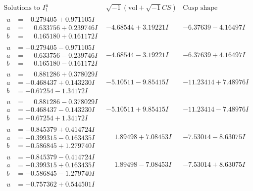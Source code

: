\documentclass[1p]{elsarticle_modified}
\theoremstyle{definition}
\newcommand{\I}{\sqrt{-1}}
\begin{document}
$$\begin{array}{c|c|c}  
\text{Solutions to }I^u_{1}& \I (\text{vol} + \sqrt{-1}CS) & \text{Cusp shape}\\
 \hline 
\begin{aligned}
u &= -0.279405 + 0.971105 I \\
a &= \phantom{-}0.633756 + 0.239746 I \\
b &= \phantom{-}0.165180 + 0.161172 I\end{aligned}
 & -4.68544 + 3.19221 I & -6.37639 - 4.16497 I \\ \hline\begin{aligned}
u &= -0.279405 - 0.971105 I \\
a &= \phantom{-}0.633756 - 0.239746 I \\
b &= \phantom{-}0.165180 - 0.161172 I\end{aligned}
 & -4.68544 - 3.19221 I & -6.37639 + 4.16497 I \\ \hline\begin{aligned}
u &= \phantom{-}0.881286 + 0.378029 I \\
a &= -0.468437 + 0.143230 I \\
b &= -0.67254 - 1.34172 I\end{aligned}
 & -5.10511 - 9.85415 I & -11.23414 + 7.48976 I \\ \hline\begin{aligned}
u &= \phantom{-}0.881286 - 0.378029 I \\
a &= -0.468437 - 0.143230 I \\
b &= -0.67254 + 1.34172 I\end{aligned}
 & -5.10511 + 9.85415 I & -11.23414 - 7.48976 I \\ \hline\begin{aligned}
u &= -0.845379 + 0.414724 I \\
a &= -0.399315 - 0.163435 I \\
b &= -0.586845 + 1.279740 I\end{aligned}
 & \phantom{-}1.89498 + 7.08453 I & -7.53014 - 8.63075 I \\ \hline\begin{aligned}
u &= -0.845379 - 0.414724 I \\
a &= -0.399315 + 0.163435 I \\
b &= -0.586845 - 1.279740 I\end{aligned}
 & \phantom{-}1.89498 - 7.08453 I & -7.53014 + 8.63075 I \\ \hline\begin{aligned}
u &= -0.757362 + 0.544501 I \\

\end{aligned}
\end{array}$$
\end{document}
